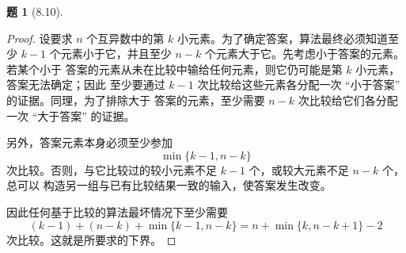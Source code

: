 \documentclass[11pt, a4paper]{article}
\newtheorem{problem}{题}
\begin{document}
\vspace{1em}

\begin{problem}[8.10]
\end{problem}

\begin{proof}
    设要求 $n$ 个互异数中的第 $k$ 小元素。为了确定答案，算法最终必须知道至少
    $k-1$ 个元素小于它，并且至少 $n-k$ 个元素大于它。先考虑小于答案的元素。若某个小于
    答案的元素从未在比较中输给任何元素，则它仍可能是第 $k$ 小元素，答案无法确定；因此
    至少要通过 $k-1$ 次比较给这些元素各分配一次 ``小于答案'' 的证据。同理，为了排除大于
    答案的元素，至少需要 $n-k$ 次比较给它们各分配一次 ``大于答案'' 的证据。

    另外，答案元素本身必须至少参加
    \[
        \min\{k-1,n-k\}
    \]
    次比较。否则，与它比较过的较小元素不足 $k-1$ 个，或较大元素不足 $n-k$ 个，总可以
    构造另一组与已有比较结果一致的输入，使答案发生改变。

    因此任何基于比较的算法最坏情况下至少需要
    \[
        (k-1)+(n-k)+\min\{k-1,n-k\}
        =n+\min\{k,n-k+1\}-2
    \]
    次比较。这就是所要求的下界。
\end{proof}
\end{document}
